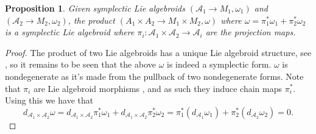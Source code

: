 \documentclass{amsart}
\newcommand{\ra}{\rightarrow}
\newtheorem{prop}[theorem]{Proposition}
\newcommand{\A}{\mathcal{A}}
\theoremstyle{definition}
\begin{document}
\begin{prop}
    Given symplectic Lie algebroids $(\A_1 \ra M_1,\omega_1)$ and $(\A_2 \ra M_2, \omega_2)$, the product $(A_1 \times A_2 \ra M_1 \times M_2 , \omega)$ where $\omega = \pi_1^* \omega_1 + \pi_2^*\omega_2$ is a symplectic Lie algebroid where $\pi_i:\A_1 \times \A_2 \ra \A_i$ are the projection maps.
\end{prop}
\begin{proof}
    The product of two Lie algebroids has a unique Lie algebroid structure, see \cite{GroupoidAlgebroidNotes}, so it remains to be seen that the above $\omega$ is indeed a symplectic form. $\omega$ is nondegenerate as it's made from the pullback of two nondegenerate forms. Note that $\pi_i$ are Lie algebroid morphisms \cite[Example 7.4]{GroupoidAlgebroidNotes}, and as such they induce chain maps $\pi_i^*$. Using this we have that
    \begin{equation*}
        d_{\A_1 \times \A_2}\omega = d_{\A_1 \times \A_2}\pi_1^* \omega_1 + d_{\A_1 \times \A_2} \pi_2^* \omega_2 = \pi_1^*(d_{\A_1}\omega_1) + \pi_2^*(d_{\A_2}\omega_2) = 0.
    \end{equation*}
\end{proof}
\end{document}
